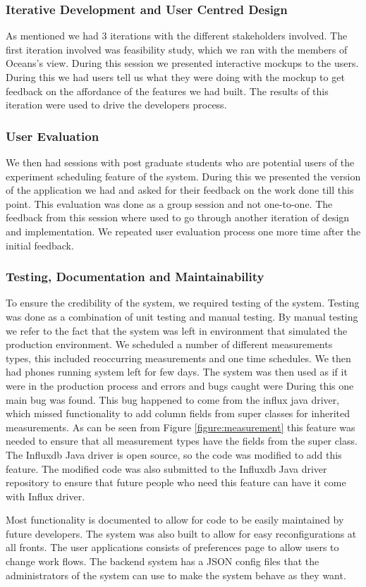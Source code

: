 \subsubsection{Iterative Development and User Centred Design}
As mentioned we had 3 iterations with the different stakeholders involved.
The first iteration involved was feasibility study, which we ran with the members of Oceans's view.
During this session we presented interactive mockups to the users.
During this we had users tell us what they were doing with the mockup to get feedback on the affordance of the features we had built.
The results of this iteration were used to drive the developers process.
\subsubsection{User Evaluation}
We then had sessions with post graduate students who are potential users of the experiment scheduling feature of the system.
During this we presented the version of the application we had and asked for their feedback on the work done till this point.
This evaluation was done as a group session and not one-to-one.
The feedback from this session where used to go through another iteration of design and implementation.
We repeated user evaluation process one more time after the initial feedback.
\subsubsection{Testing, Documentation and Maintainability}
To ensure the credibility of the system, we required testing of the system.
Testing was done as a combination of unit testing and manual testing.
By manual testing we refer to the fact that the system was left in environment that simulated the production environment.
We scheduled a number of different measurements types, this included reoccurring measurements and one time schedules.
We then had phones running system left for few days.
The system was then used as if it were in the production process and errors and bugs caught were
During this one main bug was found.
This bug happened to come from the influx java driver, which missed functionality to add column fields from super classes for inherited measurements.
As can be seen from Figure \ref{figure:measurement} this feature was needed to ensure that all measurement types have the fields from the super class.
The Influxdb Java driver is open source, so the code was modified to add this feature.
The modified code was also submitted to the Influxdb Java driver repository to ensure that future people who need this feature can have it come with Influx driver.

Most functionality is documented to allow for code to be easily maintained by future developers.
The system was also built to allow for easy reconfigurations at all fronts.
The user applications consists of preferences page to allow users to change work flows.
The backend system has a JSON config files that the administrators of the system can use to make the system behave as they want.
